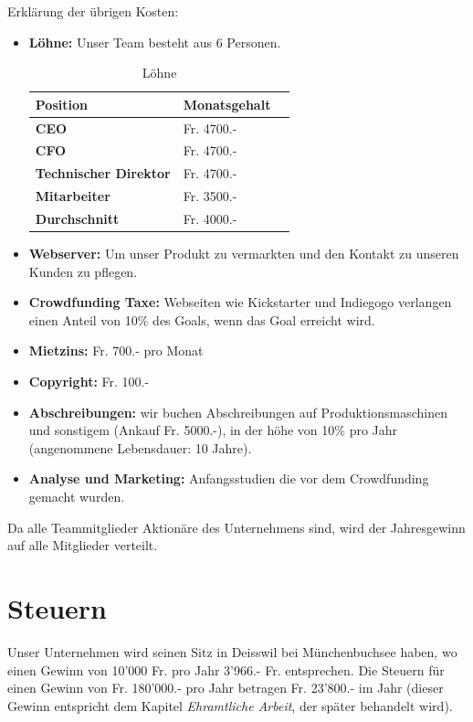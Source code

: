 Erkl\"arung der \"ubrigen Kosten:\\
\begin{itemize}
\item \textbf{L\"ohne:} Unser Team besteht aus 6 Personen. \\
\begin{table}[H]
\centering
\caption{L\"ohne}
\label{L\"ohne}
\begin{tabular}{lll}
\textbf{Position} & \textbf{Monatsgehalt}  \\ \hline
  \textbf{CEO} &  Fr. 4700.- \\ \hline
 \textbf{CFO} &  Fr. 4700.- \\ \hline
 \textbf{Technischer Direktor}& Fr. 4700.-  \\ \hline
 \textbf{Mitarbeiter} &Fr.  3500.- \\ \hline
 \textbf{Durchschnitt} & Fr. 4000.-\\ \hline
\end{tabular}
\end{table}
\item \textbf{Webserver:} Um unser Produkt zu vermarkten und den Kontakt zu unseren Kunden zu pflegen.

\item \textbf{Crowdfunding Taxe:} Webseiten wie Kickstarter und Indiegogo verlangen einen Anteil von 10\% des Goals, wenn das Goal erreicht wird.
\item \textbf{Mietzins:} Fr. 700.- pro Monat
\item \textbf{Copyright:} Fr. 100.-
\item \textbf{Abschreibungen:} wir buchen Abschreibungen auf Produktionsmaschinen und sonstigem (Ankauf Fr. 5000.-), in der h\"ohe von 10\% pro Jahr (angenommene Lebensdauer: 10 Jahre).
\item \textbf{Analyse und Marketing:} Anfangsstudien die vor dem Crowdfunding gemacht wurden.
\end{itemize}
Da alle Teammitglieder Aktion\"are des Unternehmens sind, wird der Jahresgewinn auf alle Mitglieder verteilt.
\section{Steuern}
Unser Unternehmen wird seinen Sitz in Deisswil bei M\"unchenbuchsee haben, wo einen Gewinn von 10'000 Fr. pro Jahr  3'966.- Fr. entsprechen. Die Steuern f\"ur einen Gewinn von Fr. 180'000.- pro Jahr betragen Fr. 23'800.- im Jahr (dieser Gewinn entspricht dem Kapitel \textit{Ehramtliche Arbeit}, der sp\"ater behandelt wird).
